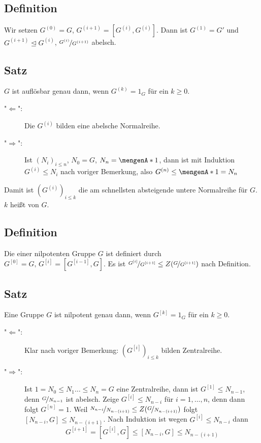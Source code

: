 \subsection[Definition: Konstruktion weiterer Kommutatorgruppen]{Definition} %
\label{sub:125}
Wir setzen $G^{(0)} = G$, $G^{(i+1)} = \left[G^{(i)}, G^{(i)}\right]$. Dann ist $G^{(1)}= G'$ und $G^{(i+1)} \unlhd G^{(i)}$, $\nicefrac{G^{(i)}}{G^{(i+1)}}$ abelsch.

\subsection[Satz: Auflösbarkeit einer Gruppe $G$]{Satz} %
\label{sub:126}
$G$ ist auflösbar genau dann, wenn $G^{(k)}= 1_G$ für ein $k \ge 0$.
\begin{description}
	\item["$\Leftarrow$":] Die $G^{(i)}$ bilden eine abelsche Normalreihe.
	\item["$\Rightarrow $":] Ist $(N_i)_{i \le n}$, $N_0 = G$, $N_n = \set{1}$, dann ist mit Induktion $G^{(i)} \le N_i$ nach voriger Bemerkung, also 
	$G^{(n)} \le \set{1} = N_n$ 
\end{description}
Damit ist $(G^{(i)})_{i \le k}$ die am schnellsten absteigende untere Normalreihe für $G$. $k$ heißt  von $G$.

\subsection[Definition: Untere Zentralreihe]{Definition} %
\label{sub:127}
Die  einer nilpotenten Gruppe $G$ ist definiert durch $G^{[0]} = G, \, G^{[i]} = \left[ G^{[i-1]}, G\right]$.
Es ist $\nicefrac{G^{[i]}}{G^{[i+1]}} \le Z(\nicefrac{G}{G^{[i+1]}})$ nach Definition.

\subsection[Satz: Charakterisierung von Nilpotenz über die untere Zentralreihe]{Satz} %
\label{sub:128}
Eine Gruppe $G$ ist nilpotent genau dann, wenn $G^{[k]} = 1_G$ für ein $k \ge 0$.
\begin{description}
	\item["$\Leftarrow $":] Klar nach voriger Bemerkung: $(G^{[i]})_{i \le k}$ bilden Zentralreihe. 
	\item["$\Rightarrow$":] Ist $1 = N_0 \le N_1 \ldots  \le N_n  = G$ eine Zentralreihe, dann ist  $G^{[1]} \le N_{n-1}$, denn $\nicefrac{G}{N_{n-1}}$ ist abelsch. Zeige
	$G^{[i]} \le N_{n-i}$ für $i=1, \ldots ,n$, denn dann folgt $G^{[n]}=1$. Weil $\nicefrac{N_{n-i}}{N_{n-(i+1)}} \le Z \enbrace*{\nicefrac{G}{N_{n-(i+1)}}}$ folgt 
	$[N_{n-i},G] \le N_{n-(i+1)}$. Nach Induktion ist wegen $G^{[i]} \le N_{n-i}$ dann 
	\[
		G^{[i+1]} = [G^{[i]}, G] \le [N_{n-i}, G] \le N_{n-(i+1)}
	\]
\end{description}

